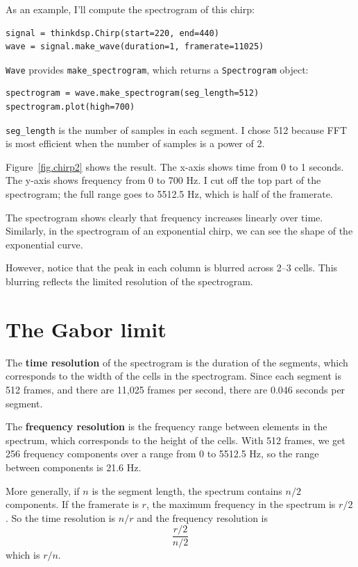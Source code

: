 \documentclass[12pt]{book}
\begin{document}
As an example, I'll compute the spectrogram of this chirp:

\begin{verbatim}
signal = thinkdsp.Chirp(start=220, end=440)
wave = signal.make_wave(duration=1, framerate=11025)
\end{verbatim}

{\tt Wave} provides \verb"make_spectrogram", which returns a
{\tt Spectrogram} object:

\begin{verbatim}
spectrogram = wave.make_spectrogram(seg_length=512)
spectrogram.plot(high=700)
\end{verbatim}

\verb"seg_length" is the number of samples in each segment.  I chose
512 because FFT is most efficient when the number of samples is a
power of 2.

Figure~\ref{fig.chirp2} shows the result.  The x-axis shows time from
0 to 1 seconds.  The y-axis shows frequency from 0 to 700 Hz.  I cut
off the top part of the spectrogram; the full range goes to 5512.5 Hz,
which is half of the framerate.

The spectrogram shows clearly that frequency increases linearly
over time.  Similarly, in the spectrogram of an exponential chirp, we
can see the shape of the exponential curve.

However, notice that the peak in each column is blurred across 2--3
cells.  This blurring reflects the limited resolution of the
spectrogram.


\section{The Gabor limit}
\label{gabor}

The {\bf time resolution} of the spectrogram is the duration of the
segments, which corresponds to the width of the cells in the
spectrogram.  Since each segment is 512 frames, and there are 11,025
frames per second, there are 0.046 seconds per segment.

The {\bf frequency resolution} is the frequency range between
elements in the spectrum, which corresponds to the height of the
cells.  With 512 frames, we get 256 frequency components over a range
from 0 to 5512.5 Hz, so the range between components is 21.6 Hz.

More generally, if $n$ is the segment length, the spectrum contains
$n/2$ components.  If the framerate is $r$, the maximum frequency in
the spectrum is $r/2$.  So the time resolution is $n/r$ and the
frequency resolution is
%
\[ \frac{r/2}{n/2} \]
%
which is $r/n$.
\end{document}
